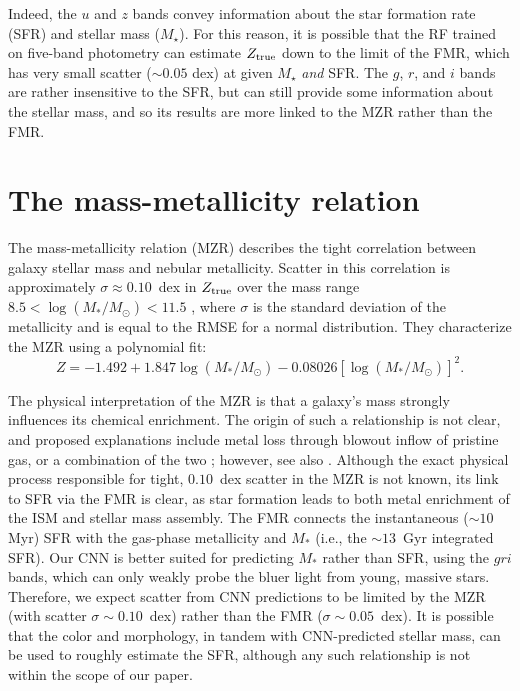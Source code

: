 \documentclass[fleqn,usenatbib]{mnras}
\begin{document}
Indeed, the $u$ and $z$ bands convey information about the star formation rate (SFR) and stellar mass ($M_\star$).
For this reason, it is possible that the RF trained on five-band photometry can estimate $Z_{\rm true}$ down to the limit of the FMR, which has very small scatter ($\sim 0.05$ dex) at given $M_{\star}$ \textit{and} SFR.
The $g$, $r$, and $i$ bands are rather insensitive to the SFR, but can still provide some information about the stellar mass, and so its results are more linked to the MZR rather than the FMR.



\section{The mass-metallicity relation} \label{sec:MMR}

The mass-metallicity relation (MZR) describes the tight correlation between galaxy stellar mass and nebular metallicity.
Scatter in this correlation is approximately $\sigma \approx 0.10$~dex in $Z_{\rm true}$ over the mass range $8.5 < \log (M_\ast / M_\odot) < 11.5$ \citep{2004ApJ...613..898T}, where $\sigma$ is the standard deviation of the metallicity and is equal to the RMSE for a normal distribution.
They characterize the MZR using a polynomial fit:
\begin{equation}\label{eq:mzr}
Z = -1.492 + 1.847 \log (M_\ast / M_\odot) - 0.08026 \left [\log(M_\ast / M_\odot)\right ]^2.
\end{equation}

The physical interpretation of the MZR is that a galaxy's mass strongly influences its chemical enrichment.
The origin of such a relationship is not clear, and proposed explanations include metal loss through blowout \citep[e.g.,][]{2002ApJ...581.1019G,2004ApJ...613..898T} inflow of pristine gas, or a combination of the two \citep[][]{2013ApJ...772..119L}; however, see also \cite{2013A&A...554A..58S}.
Although the exact physical process responsible for tight, $0.10$~dex scatter in the MZR is not known, its link to SFR via the FMR is clear, as star formation leads to both metal enrichment of the ISM and stellar mass assembly.
The FMR connects the instantaneous ($\sim 10$ Myr) SFR with the gas-phase metallicity \citep[$\sim 1$~Gyr timescales; see, e.g.,][]{2011ApJ...734...48L} and $M_{\ast}$ (i.e., the $\sim 13$~Gyr integrated SFR).
Our CNN is better suited for predicting $M_{\ast}$ rather than SFR, using the $gri$ bands, which can only weakly probe the bluer light from young, massive stars.
Therefore, we expect scatter from CNN predictions to be limited by the MZR (with scatter $\sigma \sim 0.10$~dex) rather than the FMR ($\sigma \sim 0.05$~dex).
It is possible that the color and morphology, in tandem with CNN-predicted stellar mass, can be used to roughly estimate the SFR, although any such relationship is not within the scope of our paper.
\end{document}
